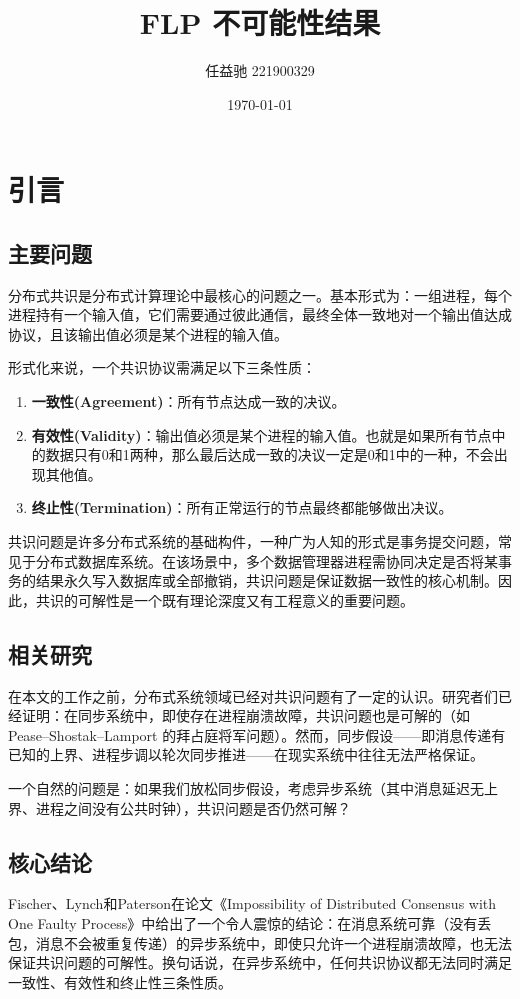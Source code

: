 \documentclass[12pt, a4paper]{ctexart}
\title{FLP 不可能性结果}
\author{任益驰 221900329}
\date{\today}
\theoremstyle{definition}
\theoremstyle{plain}
\theoremstyle{remark}
\begin{document}
\maketitle

\tableofcontents
\newpage

\section{引言}

\subsection{主要问题}
    分布式共识是分布式计算理论中最核心的问题之一。基本形式为：一组进程，每个进程持有一个输入值，它们需要通过彼此通信，最终全体一致地对一个输出值达成协议，且该输出值必须是某个进程的输入值。

    形式化来说，一个共识协议需满足以下三条性质：
    \begin{enumerate}
        \item \textbf{一致性(Agreement)}：所有节点达成一致的决议。
        \item \textbf{有效性(Validity)}：输出值必须是某个进程的输入值。也就是如果所有节点中的数据只有0和1两种，那么最后达成一致的决议一定是0和1中的一种，不会出现其他值。
        \item \textbf{终止性(Termination)}：所有正常运行的节点最终都能够做出决议。
    \end{enumerate}

    共识问题是许多分布式系统的基础构件，一种广为人知的形式是事务提交问题，常见于分布式数据库系统。在该场景中，多个数据管理器进程需协同决定是否将某事务的结果永久写入数据库或全部撤销，共识问题是保证数据一致性的核心机制。因此，共识的可解性是一个既有理论深度又有工程意义的重要问题。

\subsection{相关研究}
    在本文的工作之前，分布式系统领域已经对共识问题有了一定的认识。研究者们已经证明：在同步系统中，即使存在进程崩溃故障，共识问题也是可解的（如 Pease–Shostak–Lamport 的拜占庭将军问题）。然而，同步假设——即消息传递有已知的上界、进程步调以轮次同步推进——在现实系统中往往无法严格保证。

    一个自然的问题是：如果我们放松同步假设，考虑异步系统（其中消息延迟无上界、进程之间没有公共时钟），共识问题是否仍然可解？

\subsection{核心结论}
    Fischer、Lynch和Paterson在论文《Impossibility of Distributed Consensus with One Faulty Process》中给出了一个令人震惊的结论：在消息系统可靠（没有丢包，消息不会被重复传递）的异步系统中，即使只允许一个进程崩溃故障，也无法保证共识问题的可解性。换句话说，在异步系统中，任何共识协议都无法同时满足一致性、有效性和终止性三条性质。
\end{document}
